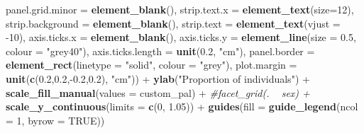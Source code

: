 \documentclass[]{article}
\newenvironment{Shaded}{\begin{snugshade}}{\end{snugshade}}
\newcommand{\KeywordTok}[1]{\textcolor[rgb]{0.13,0.29,0.53}{\textbf{{#1}}}}
\newcommand{\DataTypeTok}[1]{\textcolor[rgb]{0.13,0.29,0.53}{{#1}}}
\newcommand{\DecValTok}[1]{\textcolor[rgb]{0.00,0.00,0.81}{{#1}}}
\newcommand{\FloatTok}[1]{\textcolor[rgb]{0.00,0.00,0.81}{{#1}}}
\newcommand{\StringTok}[1]{\textcolor[rgb]{0.31,0.60,0.02}{{#1}}}
\newcommand{\CommentTok}[1]{\textcolor[rgb]{0.56,0.35,0.01}{\textit{{#1}}}}
\newcommand{\OtherTok}[1]{\textcolor[rgb]{0.56,0.35,0.01}{{#1}}}
\newcommand{\NormalTok}[1]{{#1}}
\begin{document}
\begin{Shaded}
\begin{Highlighting}[]
        \DataTypeTok{panel.grid.minor =} \KeywordTok{element_blank}\NormalTok{(),}
        \DataTypeTok{strip.text.x =} \KeywordTok{element_text}\NormalTok{(}\DataTypeTok{size=}\DecValTok{12}\NormalTok{),}
        \DataTypeTok{strip.background =} \KeywordTok{element_blank}\NormalTok{(),}
        \DataTypeTok{strip.text =} \KeywordTok{element_text}\NormalTok{(}\DataTypeTok{vjust =} \NormalTok{-}\DecValTok{10}\NormalTok{),}
        \DataTypeTok{axis.ticks.x =} \KeywordTok{element_blank}\NormalTok{(),}
        \DataTypeTok{axis.ticks.y =} \KeywordTok{element_line}\NormalTok{(}\DataTypeTok{size =} \FloatTok{0.5}\NormalTok{, }\DataTypeTok{colour =} \StringTok{"grey40"}\NormalTok{),}
        \DataTypeTok{axis.ticks.length =} \KeywordTok{unit}\NormalTok{(}\FloatTok{0.2}\NormalTok{, }\StringTok{"cm"}\NormalTok{),}
        \DataTypeTok{panel.border =} \KeywordTok{element_rect}\NormalTok{(}\DataTypeTok{linetype =} \StringTok{"solid"}\NormalTok{, }\DataTypeTok{colour =} \StringTok{"grey"}\NormalTok{),}
        \DataTypeTok{plot.margin =} \KeywordTok{unit}\NormalTok{(}\KeywordTok{c}\NormalTok{(}\FloatTok{0.2}\NormalTok{,}\FloatTok{0.2}\NormalTok{,-}\FloatTok{0.2}\NormalTok{,}\FloatTok{0.2}\NormalTok{), }\StringTok{"cm"}\NormalTok{)) +}
\StringTok{  }\KeywordTok{ylab}\NormalTok{(}\StringTok{"Proportion of individuals"}\NormalTok{) +}
\StringTok{  }\KeywordTok{scale_fill_manual}\NormalTok{(}\DataTypeTok{values =} \NormalTok{custom_pal) +}
\StringTok{  }\CommentTok{#facet_grid(. ~ sex) +}
\StringTok{  }\KeywordTok{scale_y_continuous}\NormalTok{(}\DataTypeTok{limits =} \KeywordTok{c}\NormalTok{(}\DecValTok{0}\NormalTok{, }\FloatTok{1.05}\NormalTok{)) +}
\StringTok{  }\KeywordTok{guides}\NormalTok{(}\DataTypeTok{fill =} \KeywordTok{guide_legend}\NormalTok{(}\DataTypeTok{ncol =} \DecValTok{1}\NormalTok{, }\DataTypeTok{byrow =} \OtherTok{TRUE}\NormalTok{))}
\end{Highlighting}
\end{Shaded}
\end{document}
